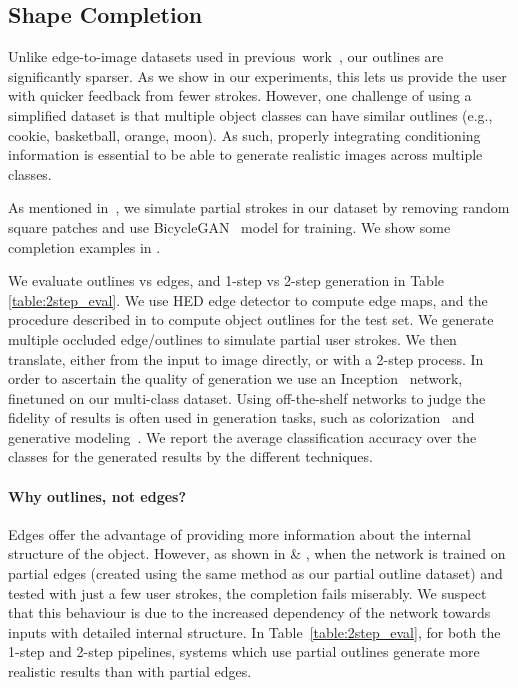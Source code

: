 \subsection{Shape Completion}

Unlike edge-to-image datasets used in previous~work~\cite{isola2016image2image,zhu2017unpaired,wang2017high}, our outlines are significantly sparser. 
As we show in our experiments, this lets us provide the user with quicker feedback from fewer strokes. 
However, one challenge of using a simplified dataset is that multiple object classes can have similar outlines (e.g., cookie, basketball, orange, moon).
As such, properly integrating conditioning information is essential to be able to generate realistic images across multiple classes.

As mentioned in~, we simulate partial strokes in our dataset by removing random square patches and use BicycleGAN~\cite{zhu2017toward} model for training. We show some completion examples in .

We evaluate outlines vs edges, and 1-step vs 2-step generation in Table \ref{table:2step_eval}. 
We use HED edge detector to compute edge maps, and the procedure described in  to compute object outlines for the test set.
We generate multiple occluded edge/outlines to simulate partial user strokes. We then translate, either from the input to image directly, or with a 2-step process. In order to ascertain the quality of generation we use an Inception~\cite{szegedy2016rethinking} network, finetuned on our multi-class dataset. Using off-the-shelf networks to judge the fidelity of results is often used in generation tasks, such as colorization~\cite{zhang2016colorful} and generative modeling~\cite{salimans2016improved}. We report the average classification accuracy over the classes for the generated results by the different techniques.


\paragraph{Why outlines, not edges?} Edges offer the advantage of providing more information about the internal structure of the object. However, as shown in  \&
, when the network is trained on partial edges (created using the same method as our partial outline dataset) and tested with just a few user strokes, the completion fails miserably. We suspect that this behaviour is due to the increased dependency of the network towards inputs with detailed internal structure. In Table~\ref{table:2step_eval}, for both the 1-step and 2-step pipelines, systems which use partial outlines generate more realistic results than with partial edges.

